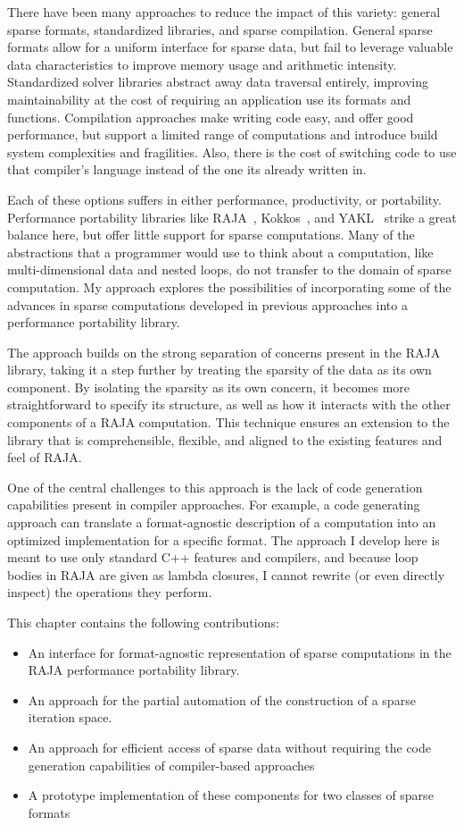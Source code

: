 There have been many approaches to reduce the impact of this variety: general sparse formats, standardized libraries, and sparse compilation.
General sparse formats allow for a uniform interface for sparse data, but fail to leverage valuable data characteristics to improve memory usage and arithmetic intensity.
Standardized solver libraries abstract away data traversal entirely, improving maintainability at the cost of requiring an application use its formats and functions.
Compilation approaches make writing code easy, and offer good performance, but support a limited range of computations and introduce build system complexities and fragilities.
Also, there is the cost of switching code to use that compiler's language instead of the one its already written in.

Each of these options suffers in either performance, productivity, or portability.
Performance portability libraries like RAJA~\cite{hornung2014RAJA}, Kokkos~\cite{edwards2014kokkos}, and YAKL~\cite{todo} strike a great balance here, but offer little support for sparse computations.
Many of the abstractions that a programmer would use to think about a computation, like multi-dimensional data and nested loops, do not transfer to the domain of sparse computation.
My approach explores the possibilities of incorporating some of the advances in sparse computations developed in previous approaches into a performance portability library.

The approach builds on the strong separation of concerns present in the RAJA library, taking it a step further by treating the sparsity of the data as its own component.
By isolating the sparsity as its own concern, it becomes more straightforward to specify its structure, as well as how it interacts with the other components of a RAJA computation.
This technique ensures an extension to the library that is comprehensible, flexible, and aligned to the existing features and feel of RAJA.

One of the central challenges to this approach is the lack of code generation capabilities present in compiler approaches.
For example, a code generating approach can translate a format-agnostic description of a computation into an optimized implementation for a specific format.
The approach I develop here is meant to use only standard C++ features and compilers, and because loop bodies in RAJA are given as lambda closures, I cannot rewrite (or even directly inspect) the operations they perform.


This chapter contains the following contributions:
\begin{itemize}
\item An interface for format-agnostic representation of sparse computations in the RAJA performance portability library.
\item An approach for the partial automation of the construction of a sparse iteration space.
\item An approach for efficient access of sparse data without requiring the code generation capabilities of compiler-based approaches
\item A prototype implementation of these components for two classes of sparse formats
\end{itemize}


